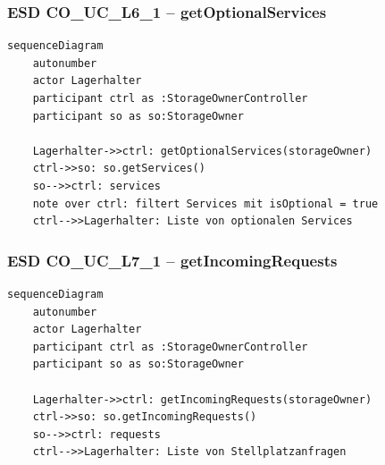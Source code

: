 \newpage

{}
\subsubsection*{ESD CO\_UC\_L6\_1 – getOptionalServices}

\begin{lstlisting}[basicstyle=\ttfamily\small, breaklines=true]
sequenceDiagram
    autonumber
    actor Lagerhalter
    participant ctrl as :StorageOwnerController
    participant so as so:StorageOwner

    Lagerhalter->>ctrl: getOptionalServices(storageOwner)
    ctrl->>so: so.getServices()
    so-->>ctrl: services
    note over ctrl: filtert Services mit isOptional = true
    ctrl-->>Lagerhalter: Liste von optionalen Services
\end{lstlisting}

\newpage

{}
\subsubsection*{ESD CO\_UC\_L7\_1 – getIncomingRequests}

\begin{lstlisting}[basicstyle=\ttfamily\small, breaklines=true]
sequenceDiagram
    autonumber
    actor Lagerhalter
    participant ctrl as :StorageOwnerController
    participant so as so:StorageOwner

    Lagerhalter->>ctrl: getIncomingRequests(storageOwner)
    ctrl->>so: so.getIncomingRequests()
    so-->>ctrl: requests
    ctrl-->>Lagerhalter: Liste von Stellplatzanfragen
\end{lstlisting}

\newpage

{}
